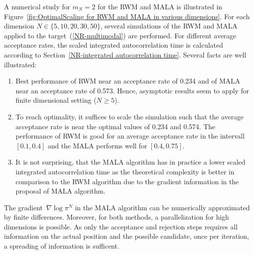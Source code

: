 A numerical study for $m_N = 2$ for the RWM and MALA is illustrated in Figure~\ref{fig:OptimalScaling for RWM and MALA in various dimensions}. For each dimension $N \in \{ 5, 10, 20, 30, 50 \}$, several simulations of the RWM and MALA applied to the target~(\ref{NR-multimodal}) are performed. For different average acceptance rates, the scaled integrated autocorrelation time is calculated according to Section~\ref{NR-integrated autocorrelation time}. Several facts are well illustrated:
\begin{enumerate}
 \item Best performance of RWM near an acceptance rate of 0.234 and of MALA near an acceptance rate of 0.573. Hence, asymptotic results seem to apply for finite dimensional setting ($N \geq 5$).
 \item To reach optimality, it suffices to scale the simulation such that the average acceptance rate is near the optimal values of 0.234 and 0.574. The performance of RWM is good for an average acceptance rate in the intervall $[0.1, 0.4]$ and the MALA performs well for $[0.4, 0.75]$.
 \item It is not surprising, that the MALA algorithm has in practice a lower scaled integrated autocorrelation time as the theoretical complexity is better in comparison to the RWM algorithm due to the gradient information in the proposal of MALA algorithm.
\end{enumerate}

\begin{rem}
 The gradient~$\nabla \log \pi^{N}$ in the MALA algorithm can be numerically approximated by finite differences. Moreover, for both methods, a parallelization for high dimensions is possible. As only the acceptance and rejection steps requires all information on the actual position and the possible candidate, once per iteration, a spreading of information is sufficent.
\end{rem}

